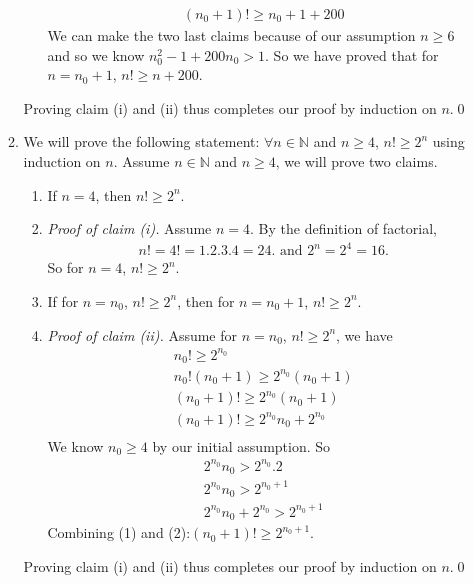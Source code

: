 \documentclass{article}
\begin{document}
\begin{enumerate}
\begin{enumerate}
\begin{enumerate}
\begin{gather*}
                            (n_0 + 1)! \ge n_0 + 1 + 200
                        \end{gather*}
                        We can make the two last claims because of our assumption $n \ge 6$ and so we know $n_0^2 - 1 + 200n_0 > 1$. So we have proved that for $n = n_0 + 1$, $n! \ge n + 200$.
                \end{enumerate}
                Proving claim (i) and (ii) thus completes our proof by induction on $n$.\qed
            \item We will prove the following statement: $\forall n \in \mathbb{N}$ and $n \ge 4$, $n! \ge 2^n$ using induction on $n$. Assume $n \in \mathbb{N}$ and $n \ge 4$, we will prove two claims.
                \begin{enumerate}
                    \item If $n = 4$, then $n! \ge 2^n$.
                    \item[] \emph{Proof of claim (i).} Assume $n = 4$. By the definition of factorial,
                        \begin{gather*}
                            n! = 4! = 1.2.3.4 = 24. \text{ and }
                            2^n = 2^4 = 16.
                        \end{gather*}
                        So for $n = 4$, $n! \ge 2^n$.
                    \item If for $n = n_0$, $n! \ge 2^n$, then for $n = n_0 + 1$, $n! \ge 2^n$.
                    \item[] \emph{Proof of claim (ii).} Assume for $n = n_0$, $n! \ge 2^n$, we have
                        \begin{gather*}
                            n_0! \ge 2^{n_0}\\
                            n_0!(n_0 + 1) \ge 2^{n_0}(n_0 + 1)\\
                            (n_0 + 1)! \ge 2^{n_0}(n_0 + 1)\\
                            (n_0 + 1)! \ge 2^{n_0}n_0 + 2^{n_0} \label{one} \\
                        \end{gather*}
                        We know $n_0 \ge 4$ by our initial assumption. So 
                        \begin{gather*}
                            2^{n_0}n_0 > 2^{n_0}.2\\
                            2^{n_0}n_0 > 2^{n_0 + 1}\\
                            2^{n_0}n_0 + 2^{n_0} > 2^{n_0 + 1}
                        \end{gather*}
                        Combining (1) and (2):$(n_0 + 1)! \ge 2^{n_0 + 1}$. 
                \end{enumerate}
                Proving claim (i) and (ii) thus completes our proof by induction on $n$.\qed
        \end{enumerate}
\end{enumerate}
\end{document}
